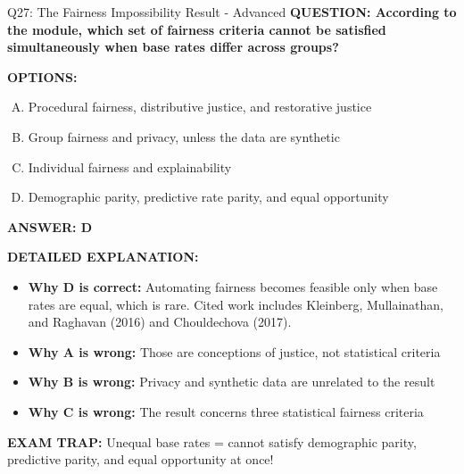 \documentclass[8pt]{beamer}
\begin{document}
\begin{frame}[shrink=6]{Q27: The Fairness Impossibility Result - Advanced}
\fontsize{6.5}{7.5}\selectfont
\textbf{QUESTION: According to the module, which set of fairness criteria cannot be satisfied simultaneously when base rates differ across groups?}

\vspace{0.1cm}
\textbf{OPTIONS:}
\begin{enumerate}[A.]
\item Procedural fairness, distributive justice, and restorative justice
\item Group fairness and privacy, unless the data are synthetic
\item Individual fairness and explainability
\item Demographic parity, predictive rate parity, and equal opportunity
\end{enumerate}

\vspace{0.1cm}
\textcolor{myblue}{\textbf{ANSWER: D}}

\vspace{0.1cm}
\textbf{DETAILED EXPLANATION:}
\begin{itemize}
\item \textbf{Why D is correct:} Automating fairness becomes feasible only when base rates are equal, which is rare. Cited work includes Kleinberg, Mullainathan, and Raghavan (2016) and Chouldechova (2017).
\item \textbf{Why A is wrong:} Those are conceptions of justice, not statistical criteria
\item \textbf{Why B is wrong:} Privacy and synthetic data are unrelated to the result
\item \textbf{Why C is wrong:} The result concerns three statistical fairness criteria
\end{itemize}

\textcolor{myred}{\textbf{EXAM TRAP:}} Unequal base rates = cannot satisfy demographic parity, predictive parity, and equal opportunity at once!
\end{frame}
\end{document}
